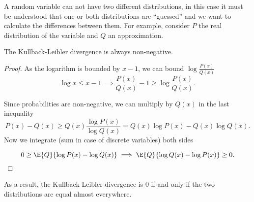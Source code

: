 \begin{remark}
  A random variable can not have two different distributions, in this case it must be understood that one or both distributions are ``guessed'' and we want to calculate the differences between them. For example, consider \(P\) the real distribution of the variable and \(Q\) an approximation.
\end{remark}

\begin{proposition}
The Kullback-Leibler divergence is always non-negative.
\end{proposition}
\begin{proof}
  As the logarithm is bounded by \(x - 1\), we can bound \(\log{\frac{P(x)}{Q(x)}}\)
  \[
    \log{x} \leq x - 1 \implies \frac{P(x)}{Q(x)} - 1 \geq \log{\frac{P(x)}{Q(x)}}.
  \]

  Since probabilities are non-negative, we can multiply by \(Q(x)\) in the last inequality
  \[
    P(x) - Q(x) \geq Q(x) \frac{\log P(x)}{\log Q(x)} = Q(x) \log{P(x)} - Q(x) \log{Q(x)}.
  \]
  Now we integrate (sum in case of discrete variables) both sides

  \[
    0 \geq \E{Q}{\log{P(x)} - \log{Q(x)}} \implies \E{Q}{\log{Q(x)}
    - \log{P(x)}} \geq 0.
  \]
\end{proof}
As a result, the Kullback-Leibler divergence is \(0\) if and only if the two
distributions are equal almost everywhere.

